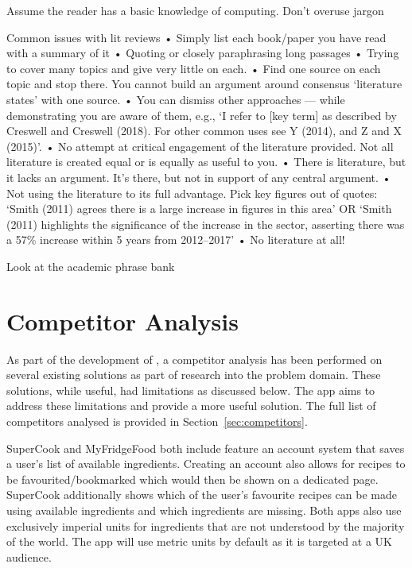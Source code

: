 {    Assume the reader has a basic knowledge of computing. Don't overuse jargon

    Common issues with lit reviews
    • Simply list each book/paper you have read with a summary of it
    • Quoting or closely paraphrasing long passages
    • Trying to cover many topics and give very little on each.
    • Find one source on each topic and stop there. You cannot build an argument around consensus \enquote*{literature states} with one source.
    • You can dismiss other approaches --- while demonstrating you are aware of them, e.g., \enquote*{I refer to [key term] as described by Creswell and Creswell (2018). For other common uses see Y (2014), and Z and X (2015)}.
    • No attempt at critical engagement of the literature provided. Not all literature is created equal or is equally as useful to you.
    • There is literature, but it lacks an argument. It's there, but not in support of any central argument.
    • Not using the literature to its full advantage. Pick key figures out of quotes:
    \enquote*{Smith (2011) agrees there is a large increase in figures in this area} OR
    \enquote*{Smith (2011) highlights the significance of the increase in the sector, asserting there was a 57\% increase within 5 years from 2012--2017}
    • No literature at all!

    Look at the academic phrase bank
}

\section{Competitor Analysis}\label{sec:competitor_analysis}

As part of the development of \chef{}, a competitor analysis has been performed on several existing solutions as part of research
into the problem domain. These solutions, while useful, had limitations as discussed below. The \chef{} app aims to address
these limitations and provide a more useful solution. The full list of competitors analysed is provided in Section~\ref{sec:competitors}.

SuperCook and MyFridgeFood both include feature an account system
that saves a user's list of available ingredients. Creating an account also allows for recipes to be favourited/bookmarked
which would then be shown on a dedicated page. SuperCook additionally shows which of the user's favourite recipes
can be made using available ingredients and which ingredients are missing. Both apps also use exclusively imperial
units for ingredients that are not understood by the majority of the world. The \chef{} app will use metric units by default
as it is targeted at a UK audience.

